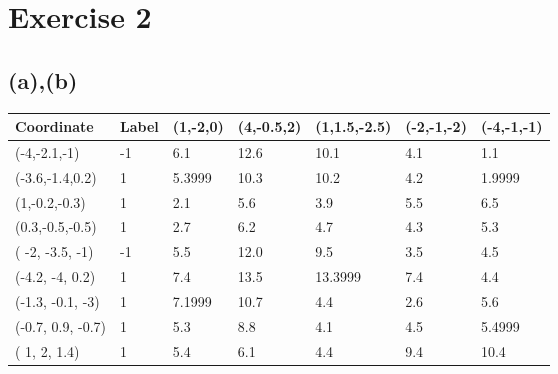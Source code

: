 \documentclass[12pt]{article}
\begin{document}
\section*{Exercise 2}
\subsection*{(a),(b)}
\begin{table}[h!]
\begin{tabular}{lllllll}
\hline
Coordinate           & Label & (1,-2,0)                    & (4,-0.5,2)                  & (1,1.5,-2.5)                & (-2,-1,-2)                  & (-4,-1,-1)                     \\ \hline
(-4,-2.1,-1)         & -1    & 6.1                         & 12.6                        & 10.1                        & 4.1                         & \cellcolor[HTML]{FFFE65}1.1    \\
(-3.6,-1.4,0.2)      & 1     & 5.3999                      & 10.3                        & 10.2                        & \cellcolor[HTML]{FFCC67}4.2 & \cellcolor[HTML]{FFFE65}1.9999 \\
(1,-0.2,-0.3)        & 1     & \cellcolor[HTML]{FFFE65}2.1 & 5.6                         & \cellcolor[HTML]{FFFE65}3.9 & 5.5                         & 6.5                            \\
(0.3,-0.5,-0.5)      & 1     & \cellcolor[HTML]{FFCC67}2.7 & 6.2                         & 4.7                         & 4.3                         & 5.3                            \\
( -2, -3.5, -1)      & -1    & 5.5                         & 12.0                        & 9.5                         & \cellcolor[HTML]{FFFE65}3.5 & 4.5                            \\
(-4.2, -4, 0.2)      & 1     & 7.4                         & 13.5                        & 13.3999                     & 7.4                         & \cellcolor[HTML]{FFCC67}4.4    \\
(-1.3, -0.1, -3)     & 1     & 7.1999                      & 10.7                        & 4.4                         & \cellcolor[HTML]{FFFE65}2.6 & 5.6                            \\
(-0.7, 0.9, -0.7)    & 1     & 5.3                         & 8.8                         & \cellcolor[HTML]{FFCC67}4.1 & 4.5                         & 5.4999                         \\
( 1, 2, 1.4)         & 1     & 5.4                         & 6.1                         & 4.4                         & 9.4                         & 10.4                           \\

\end{tabular}
\end{table}
\end{document}

